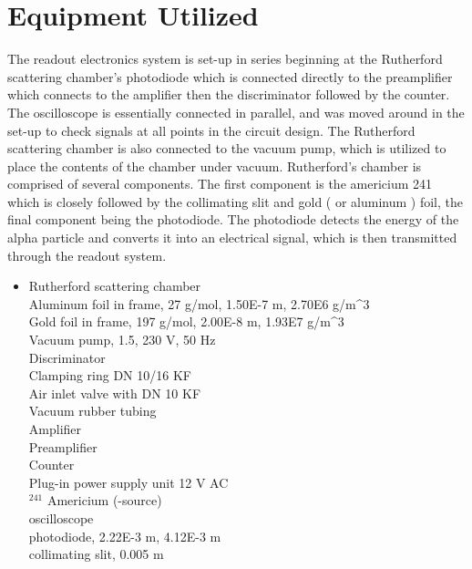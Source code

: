\documentclass[a4paper]{article}
\begin{document}
\qq 

\qq 

\section{Equipment Utilized}

\qq The readout electronics system is set-up in series beginning at
the Rutherford scattering chamber's photodiode which is connected
directly to the preamplifier which connects to the amplifier then the
discriminator followed by the counter. The oscilloscope is essentially
connected in parallel, and was moved around in the set-up to check
signals at all points in the circuit design. The Rutherford scattering
chamber is also connected to the vacuum pump, which is utilized to
place the contents of the chamber under vacuum. Rutherford's chamber
is comprised of several components. The first component is the
americium 241 which is closely followed by the collimating slit and
gold ( or aluminum ) foil, the final component being the
photodiode. The photodiode detects the energy of the alpha particle
and converts it into an electrical signal, which is then transmitted
through the readout system.

\begin{itemize}
\item 
Rutherford scattering chamber \\ Aluminum foil in frame, 27 g/mol,
1.50E-7 m, 2.70E6 g/m^3 \\ Gold foil in frame, 197 g/mol, 2.00E-8 m,
1.93E7 g/m^3 \\ Vacuum pump, 1.5, 230 V, 50 Hz \\ Discriminator
\\ Clamping ring DN 10/16 KF \\ Air inlet valve with DN 10 KF
\\ Vacuum rubber tubing \\ Amplifier \\ Preamplifier \\ Counter
\\ Plug-in power supply unit 12 V AC \\ $ ^{241}$ Americium (-source)
\\ oscilloscope \\ photodiode, 2.22E-3 m, 4.12E-3 m \\ collimating
slit, 0.005 m \\
\end{itemize}
\end{document}
